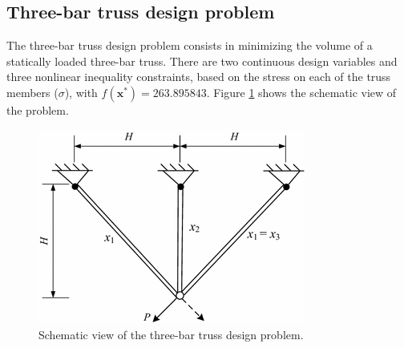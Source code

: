 
\subsection*{Three-bar truss design problem}

The three-bar truss design problem \citep{TB} consists in minimizing the volume of a statically loaded three-bar truss. There are two continuous design variables and three nonlinear inequality constraints, based on the stress on each of the truss members ($\sigma$), with $f(\bm{x}^*) = 263.895843$. Figure \ref{fig:TB} shows the schematic view of the problem.

\begin{figure}[h]
    \begin{center}
    \includegraphics[scale=0.5]{Imgs/TB.png}
    \end{center}
    \captionsetup{justification=centering}
    \caption{Schematic view of the three-bar truss design problem.}\label{fig:TB}
\end{figure}

